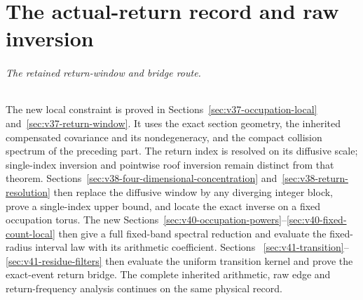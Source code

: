 \documentclass[11pt,reqno]{amsart}
\numberwithin{equation}{section}
\theoremstyle{definition}\newtheorem{definition}[theorem]{Definition}
\theoremstyle{remark}\newtheorem{remark}[theorem]{Remark}
\begin{document}
\part{The actual-return record and raw inversion}
\paragraph{The retained return-window and bridge route.}
The new local constraint is proved in
Sections~\ref{sec:v37-occupation-local} and~\ref{sec:v37-return-window}.
It uses the exact section geometry, the inherited compensated
covariance and its nondegeneracy, and the compact collision spectrum
of the preceding part. The return index is resolved on its diffusive scale;
single-index inversion and pointwise roof inversion remain distinct
from that theorem. Sections~\ref{sec:v38-four-dimensional-concentration}
and~\ref{sec:v38-return-resolution} then replace the diffusive window
by any diverging integer block, prove a single-index upper bound, and
locate the exact inverse on a fixed occupation torus. The new
Sections~\ref{sec:v40-occupation-powers}--\ref{sec:v40-fixed-count-local}
then give a full fixed-band spectral reduction and evaluate the
fixed-radius interval law with its arithmetic coefficient. Sections~
\ref{sec:v41-transition}--\ref{sec:v41-residue-filters} then evaluate
the uniform transition kernel and prove the exact-event return bridge. The
complete inherited arithmetic, raw edge and return-frequency analysis
continues on the same physical record.

















\end{document}
